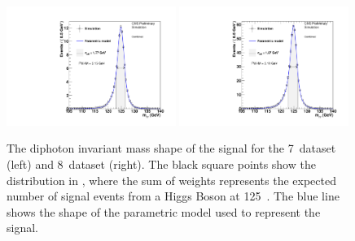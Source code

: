 \begin{figure}
  \begin{center}
    \includegraphics[width=0.49\textwidth]{ch5_anal_and_results/plots/thesis_signal_7TeV/all.pdf}
    \includegraphics[width=0.49\textwidth]{ch5_anal_and_results/plots/thesis_signal_8TeV/all.pdf}
    \caption{The diphoton invariant mass shape of the \SM signal for the 7~\TeV dataset (left) and 8~\TeV dataset (right). The black square points show the distribution in \MC, where the sum of weights represents the expected number of signal events from a \SM Higgs Boson at 125~\GeV. The blue line shows the shape of the parametric model used to represent the signal.}
    \label{fig:sig_shape}
  \end{center}
\end{figure}


  
